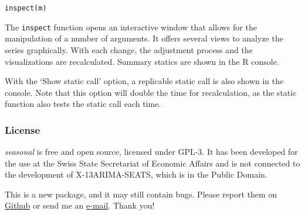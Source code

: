 \begin{verbatim}
inspect(m)
\end{verbatim}

The \texttt{inspect} function opens an interactive window that allows
for the manipulation of a number of arguments. It offers several views
to analyze the series graphically. With each change, the adjustment
process and the visualizations are recalculated. Summary statics are
shown in the R console.

With the `Show static call' option, a replicable static call is also
shown in the console. Note that this option will double the time for
recalculation, as the static function also tests the static call each
time.

\subsubsection{License}\label{license}

\emph{seasonal} is free and open source, licensed under GPL-3. It has
been developed for the use at the Swiss State Secretariat of Economic
Affairs and is not connected to the development of X-13ARIMA-SEATS,
which is in the Public Domain.

This is a new package, and it may still contain bugs. Please report them
on \href{https://github.com/christophsax/seasonal}{Github} or send me an
\href{mailto:christoph.sax@gmail.com}{e-mail}. Thank you!
